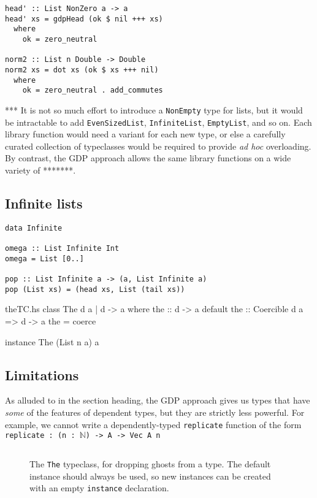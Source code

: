 \documentclass[format=sigplan, review=false, screen=true]{acmart}
\begin{document}
\begin{verbatim}
head' :: List NonZero a -> a
head' xs = gdpHead (ok $ nil +++ xs)
  where
    ok = zero_neutral

norm2 :: List n Double -> Double
norm2 xs = dot xs (ok $ xs +++ nil)
  where
    ok = zero_neutral . add_commutes
\end{verbatim}

*** It is not so much effort to introduce a \texttt{NonEmpty} type for lists, but it
would be intractable to add \texttt{EvenSizedList}, \texttt{InfiniteList},
\texttt{EmptyList}, and so on. Each library function would need a variant
for each new type, or else a carefully curated collection of typeclasses would
be required to provide \emph{ad hoc} overloading. By contrast, the GDP approach
allows the same library functions on a wide variety of *******.

\subsection{Infinite lists}

\begin{verbatim}
data Infinite

omega :: List Infinite Int
omega = List [0..]

pop :: List Infinite a -> (a, List Infinite a)
pop (List xs) = (head xs, List (tail xs))
\end{verbatim}

\begin{filecontents*}{theTC.hs}
class The d a | d -> a where
    the :: d -> a
    default the :: Coercible d a => d -> a
    the = coerce
    
instance The (List n a) a
\end{filecontents*}

\subsection{Limitations}
As alluded to in the section heading, the GDP approach gives us
types that have \emph{some} of the features of dependent types, but
they are strictly less powerful. For example, we cannot
write a dependently-typed \texttt{replicate} function of the form
\texttt{replicate : (n : $\mathbb{N}$) -> A -> Vec A n}

\begin{figure}
  \inputminted{haskell}{theTC.hs}
  \caption{The \texttt{The} typeclass, for dropping ghosts
    from a type. The default instance should always be used,
    so new instances can be created with an empty
    \texttt{instance} declaration.}
\end{figure}
\end{document}
